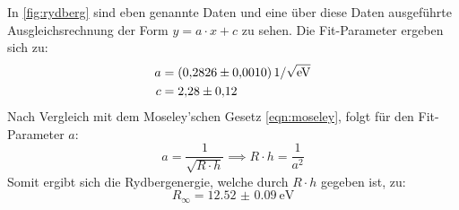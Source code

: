   \noindent In \autoref{fig:rydberg} sind eben genannte Daten und eine über diese Daten ausgeführte Ausgleichsrechnung der Form $y = a \cdot x + c $ zu sehen.
  Die Fit-Parameter ergeben sich zu:
  \begin{align*}
    a &= \SI{0.2826 \pm 0.0010}{1\per\sqrt{\electronvolt}}\\
    c &= \num{2.28 \pm 0.12}
  \end{align*}
  Nach Vergleich mit dem Moseley'schen Gesetz \eqref{eqn:moseley}, folgt für den Fit-Parameter $a$:
  \begin{equation*}
    a = \frac{1}{\sqrt{R\cdot h}} \implies R \cdot h = \frac{1}{a^2}
  \end{equation*}
  Somit ergibt sich die Rydbergenergie, welche durch $R \cdot h $ gegeben ist, zu:
  \begin{equation*}
    R_{\infty} = \SI{12.52(9)}{\electronvolt}
  \end{equation*}